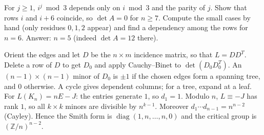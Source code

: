 \documentclass[11pt,a4paper]{article}
\begin{document}
For \(j\ge1\), \(i^j\bmod3\) depends only on \(i\bmod3\) and the parity of \(j\). Show that rows \(i\) and \(i+6\) coincide, so \(\det A=0\) for \(n\ge7\).
Compute the small cases by hand (only residues \(0,1,2\) appear) and find a dependency among the rows for \(n=6\). Answer: \(n=5\) (indeed \(\det A=12\) there).

Orient the edges and let \(D\) be the \(n\times m\) incidence matrix, so that \(L=DD^T\). Delete a row of \(D\) to get \(D_0\) and apply Cauchy--Binet to \(\det(D_0D_0^T)\).
An \((n-1)\times(n-1)\) minor of \(D_0\) is \(\pm1\) if the chosen edges form a spanning tree, and \(0\) otherwise. A cycle gives dependent columns; for a tree, expand at a leaf.
For \(L(K_n)=nE-J\): the entries generate \(1\), so \(d_1=1\). Modulo \(n\), \(L\equiv-J\) has rank \(1\), so all \(k\times k\) minors are divisible by \(n^{k-1}\). Moreover \(d_1\cdots d_{n-1}=n^{n-2}\) (Cayley). Hence the Smith form is \(\operatorname{diag}(1,n,\dots,n,0)\) and the critical group is \((\mathbb Z/n)^{n-2}\).
\end{document}
